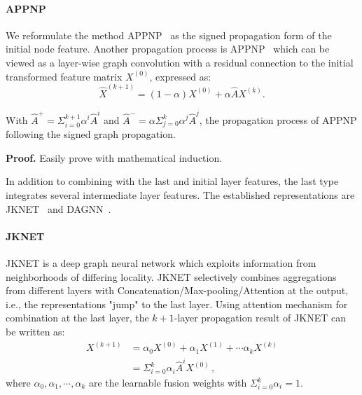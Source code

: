 \paragraph{APPNP}
We reformulate the method APPNP~\citep{appap} as the signed propagation form of the initial node feature. 
Another propagation process is APPNP~\citep{appap} which can be viewed as a layer-wise graph convolution with a residual connection to the initial transformed
feature matrix $X^{(0)}$, expressed as: 
\begin{equation}
 \hat{X}^{(k+1)} = (1-\alpha)X^{(0)}  + \alpha \hat{A} X ^{(k)}.
\end{equation}
\begin{theorem}
With $\hat{A}^+=\Sigma_{i=0}^{k+1}\alpha^i\hat{A}^i$ and $\hat{A}^-=\alpha \Sigma_{j=0}^{k}\alpha^j\hat{A}^j$, the propagation process of APPNP following the signed graph propagation.
\end{theorem}
\textbf{Proof.}
Easily prove with mathematical induction.

In addition to combining with the last and initial layer features, the last type integrates several intermediate layer features. The established representations are JKNET~\citep{jknet} and DAGNN~\citep{dagnn}.
\paragraph{JKNET}
JKNET is a deep graph neural network which exploits information from neighborhoods of differing locality. 
JKNET selectively combines aggregations from different layers with Concatenation/Max-pooling/Attention at the output, i.e., the representations "jump" to the last layer.
Using attention mechanism for combination at the last layer, the $k+1$-layer propagation result of JKNET can be written as:
\begin{equation}
    \label{eq:jk-net}
    \begin{split}
         X^{(k+1)} &= \alpha_0 X^{(0)}  + \alpha_1  X ^{(1)} + \cdots \alpha_k X^{(k)}\\
        &= \Sigma_{i=0}^k\alpha_i \hat{A}^i X^{(0)}\,,
    \end{split}
\end{equation}
where $\alpha_0, \alpha_1, \cdots, \alpha_{k}$ are the learnable fusion weights with $\Sigma_{i=0}^k\alpha_i=1$.

